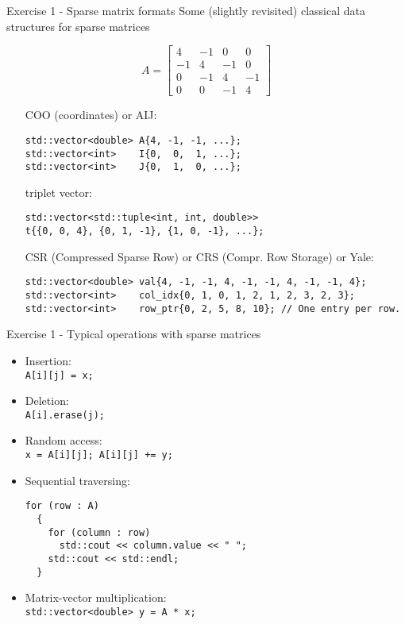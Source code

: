 \documentclass[10pt]{beamer}
\begin{document}
\begin{frame}[fragile]{Exercise 1 - Sparse matrix formats}
Some (slightly revisited) classical data structures for sparse matrices

\begin{equation*}
A = 
\begin{bmatrix}
4  & -1 & 0  & 0\\
-1 &  4 & -1 & 0\\
0  & -1 &  4 & -1\\
0  &  0 &  -1& 4
\end{bmatrix}
\end{equation*}

\begin{itemize}
\item [COO] (coordinates) or AIJ: \tiny
\begin{lstlisting}
std::vector<double> A{4, -1, -1, ...};
std::vector<int>    I{0,  0,  1, ...};
std::vector<int>    J{0,  1,  0, ...};
\end{lstlisting} \normalsize
\item [triplet] vector:\tiny
\begin{lstlisting}
std::vector<std::tuple<int, int, double>> 
t{{0, 0, 4}, {0, 1, -1}, {1, 0, -1}, ...};
\end{lstlisting} \normalsize
\item [CSR] (Compressed Sparse Row) or CRS (Compr. Row Storage) or Yale:\tiny
\begin{lstlisting}
std::vector<double> val{4, -1, -1, 4, -1, -1, 4, -1, -1, 4};
std::vector<int>    col_idx{0, 1, 0, 1, 2, 1, 2, 3, 2, 3};
std::vector<int>    row_ptr{0, 2, 5, 8, 10}; // One entry per row.
\end{lstlisting} 
\end{itemize}
\end{frame}

\begin{frame}[fragile]{Exercise 1 - Typical operations with sparse matrices} 
\begin{itemize}
\item Insertion: \\
\lstinline|A[i][j] = x;|
\item Deletion: \\
\lstinline|A[i].erase(j);|
\item Random access: \\
\lstinline|x = A[i][j]; A[i][j] += y;|
\item Sequential traversing:
\small\begin{lstlisting}
for (row : A)
  {
    for (column : row)
  	  std::cout << column.value << " ";
    std::cout << std::endl;
  }
\end{lstlisting}\normalsize
\item Matrix-vector multiplication:\\
\lstinline|std::vector<double> y = A * x;|
\end{itemize}
\end{frame}
\end{document}

